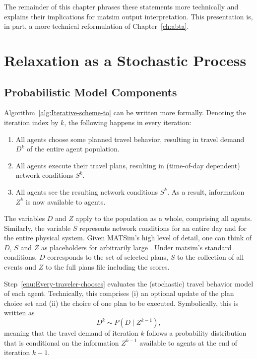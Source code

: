 The remainder of this chapter phrases these statements more technically and explains 
their implications for \gls{matsim} output interpretation.  This presentation is, in part, a 
more technical reformulation of Chapter~\ref{ch:abta}.


\section{\label{sec:Relaxation-as-a}Relaxation as a Stochastic Process}


\subsection{\label{sub:Probabilistic-model-components}Probabilistic Model Components}

Algorithm~\ref{alg:Iterative-scheme-to} can be written more formally.
Denoting the iteration index by $k$, the following happens in every
iteration:
\begin{enumerate}
\item \label{enu:Every-traveler-chooses}All agents choose some planned
travel behavior, resulting in  travel demand $D^{k}$ of the entire
agent population.
\item \label{enu:All-travelers-execute}All agents execute their travel
plans, resulting in  (time-of-day dependent) network conditions
$S^{k}$.
\item \label{enu:All-travelers-observe}All agents see the resulting network
conditions $S^{k}$. As a result,  information $Z^{k}$ is now
available to  agents.
\end{enumerate}
The variables $D$ and $Z$ apply to the population as a whole, comprising
all agents. Similarly, the variable $S$ represents network conditions
for an entire day and for the entire physical system. Given MATSim's
high level of detail, one can think of $D$, $S$ and $Z$ as
placeholders for arbitrarily large .
Under \gls{matsim}'s standard conditions, $D$ corresponds to the set of selected
plans, $S$ to the collection of all events 
and $Z$ to the full plans file including the scores.

Step~\ref{enu:Every-traveler-chooses} evaluates the (stochastic)
travel behavior model of each agent. Technically, this comprises (i)
an optional update of the plan choice set and (ii) the choice of one
plan to be executed. Symbolically, this is written as
\begin{equation}
D^{k}\sim P(D\mid Z^{k-1}),\label{eq:choice-model}
\end{equation}\corr{,}{}
meaning that 
{the travel demand of iteration $k$ follows a probability distribution
that is conditional on the information} $Z^{k-1}$
available to agents at the end of iteration $k-1$.

